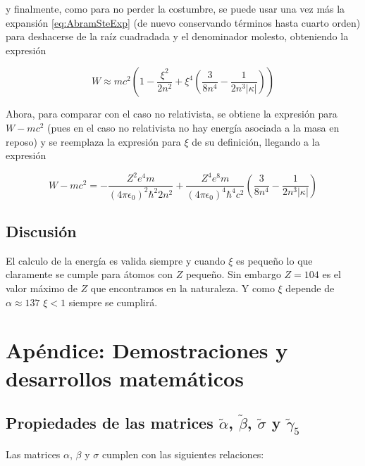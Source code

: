 \documentclass[a4paper, 12pt]{article} %
\begin{document}
y finalmente, como para no perder la costumbre, se puede usar una vez m\'as la expansi\'on \ref{eq:AbramSteExp} (de nuevo conservando t\'erminos hasta cuarto orden) para deshacerse de la ra\'iz cuadradada y el denominador molesto, obteniendo la expresi\'on

\begin{equation}\label{eq:enerW4}
W\approx mc^2 \left(  1- \frac{\xi^2}{2n^2} +\xi^4 \left( \frac{3}{8n^4}-\frac{1}{2n^3 |\kappa|} \right)  \right)
\end{equation}

Ahora, para comparar con el caso no relativista, se obtiene la expresi\'on para $W-mc^2$ (pues en el caso no relativista no hay energ\'ia asociada a la masa en reposo) y se reemplaza la expresi\'on para $\xi$ de su definici\'on, llegando a la expresi\'on 

\begin{equation}\label{eq:enerWfinal}
W-mc^2 = -\frac{Z^2e^4m}{(4\pi\epsilon_0)^2\hbar^2 2n^2}+\frac{Z^4e^8m}{(4\pi\epsilon_0)^4\hbar^4 c^2} \left( \frac{ 3}{8n^4}-\frac{1}{2n^3|\kappa|} \right)
\end{equation}


\subsection{Discusi\'on}

El calculo de la energ\'ia es valida siempre y cuando $\xi$ es peque\~no lo que claramente
se cumple para \'atomos con $Z$ peque\~no. Sin embargo $Z = 104 $ es el valor m\'aximo 
de $Z$ que encontramos en la naturaleza. Y como $\xi$ depende de $\alpha \approx 137$
$\xi<1$ siempre se cumplir\'a.  


\section{Ap\'endice: Demostraciones y desarrollos matem\'aticos}\label{sec:apendice}

\subsection{Propiedades de las matrices $\widetilde{\alpha}$, $\widetilde{\beta}$,  
$\widetilde{\sigma}$ y $\widetilde{\gamma}_5$}\label{sec:gamma5}

Las matrices $\alpha$, $\beta$ y $\sigma$ cumplen con las siguientes relaciones:
\end{document}
